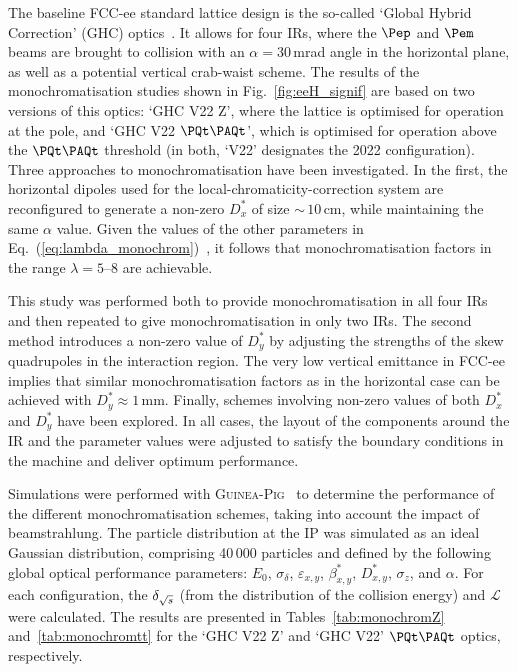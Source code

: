 The baseline FCC-ee standard lattice design is the so-called `Global Hybrid Correction' (GHC) optics~\cite{Oide:2016mkm,Keintzel:2023myn,vanRiesen-Haupt:2024ore}.
It allows for four IRs, where the $\Pep$ and $\Pem$ beams are brought to collision 
with an $\alpha= 30$\,mrad angle in the horizontal plane, as well as a potential vertical crab-waist scheme. 
The results of the monochromatisation studies shown in Fig.~\ref{fig:eeH_signif} are based on two versions of this optics: 
`GHC V22 Z', where the lattice is optimised for operation at the \PZ pole, and 
`GHC V22 $\PQt\PAQt$', which is optimised for operation above the $\PQt\PAQt$ threshold 
(in both, `V22' designates the 2022 configuration).
Three approaches to monochromatisation have been investigated.  
In the first, the horizontal dipoles used for the local-chromaticity-correction system are reconfigured to generate a non-zero $D^\ast_x$ of size ${\sim}\, 10$\,cm, 
while maintaining the same $\alpha$ value.  
Given the values of the other parameters in Eq.~(\ref{eq:lambda_monochrom})~\cite{Keintzel:2023myn}, it follows that monochromatisation factors in the range $\lambda = 5$--8 are achievable. 

This study was performed both to provide monochromatisation in all four IRs and then repeated to give monochromatisation in only two IRs.
The second method introduces a non-zero value of $D^\ast_y$ by adjusting the strengths of the skew quadrupoles in the interaction region.  
The very low vertical emittance in FCC-ee implies that similar monochromatisation factors as in the horizontal case 
can be achieved with $D^\ast_y \approx 1$\,mm.  
Finally, schemes involving non-zero values of both $D^\ast_x$ and $D^\ast_y$ have been explored.   
In all cases, the layout of the components around the IR and the parameter values were adjusted to satisfy the boundary conditions in the machine and deliver optimum performance.

Simulations were performed with \textsc{Guinea-Pig}~\cite{Schulte:1998au} to determine  the performance of the different monochromatisation schemes, taking into account the impact of beamstrahlung. 
The particle distribution at the IP was simulated as an ideal Gaussian distribution, comprising 40\,000 particles and defined by the following global optical performance parameters: 
$E_0$, $\sigma_{\delta}$, $\varepsilon_{x,y}$, $\beta_{x,y}^{\ast}$, $D_{x,y}^{\ast}$, $\sigma_{z}$, and $\alpha$. 
For each configuration, the $\delta_{\sqrt{s}}$ (from the distribution of the collision energy) and $\mathcal{L}$ were calculated. 
The results are presented in Tables~\ref{tab:monochromZ} and~\ref{tab:monochromtt} for the `GHC V22 Z' and `GHC V22' $\PQt\PAQt$ optics, respectively.
 
